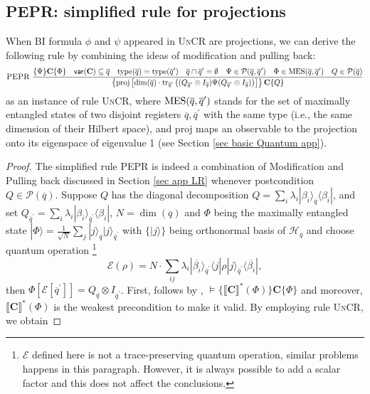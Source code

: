 \documentclass[conference,compsoc, 10pt]{IEEEtran}
\newcommand {\qbar} {{\overline{q}}}
\newcommand {\cP } {{\mathcal{P}}}
\newcommand {\cH } {{\mathcal{H}}}
\newcommand {\cE } {{\mathcal{E}}}
\newcommand {\id } {{I}}
\newcommand {\ptype} {{\mathrm{type}}}
\newcommand {\tr } {{\mathrm{tr}}}
\newcommand {\var } {\mathsf{var}}
\newcommand {\prog } {{\mathbf{C}}}
\newcommand {\sem}[1] {\llbracket#1\rrbracket}
\newcommand {\ol}[1] {{\overline{#1}}}
\def\>{\ensuremath{\rangle}}
\def\<{\ensuremath{\langle}}
\newcommand{\proj}{{\mathrm{proj}}}
\begin{document}
\begin{appendices}
		\subsection{\textsc{PEPR}: simplified rule for projections}
		\label{rule PERP}
		
		When BI formula $\phi$ and $\psi$ appeared in \textsc{UnCR} are projections, we can derive the following rule by combining the ideas of modification and pulling back: 
		\begin{equation*}
		\textsc{PEPR}\ \frac{\{\Psi\}\prog\{\Phi\}\quad \var(\prog)\subseteq \qbar\quad \ptype(\qbar) = \ptype(\qbar^\prime)\quad \qbar\cap\qbar^\prime=\emptyset \quad \Psi\in\cP(\qbar,\qbar^\prime)\quad\Phi\in{\rm MES}(\qbar,\qbar^\prime)\quad Q\in\cP(\qbar)}{\left\{\proj\left[\dim(\qbar)\cdot\tr_{\qbar^\prime}\left((Q_{\qbar^\prime}\otimes\id_{\qbar})\Psi(Q_{\qbar^\prime}\otimes\id_{\qbar})\right)\right]\right\}\prog\{Q\}}	
		\end{equation*}
		as an instance of rule \textsc{UnCR}, where ${\rm MES}(\qbar,\qbar^\prime)$ stands for the set of maximally entangled states of two disjoint registers $\qbar,\qbar^\prime$ with the same type (i.e., the same dimension of their Hilbert space), and $\proj$ maps an observable to the projection onto its eigenspace of eigenvalue 1 (see Section \ref{sec basic Quantum app}). 
		\begin{proof}
			The simplified rule \textsc{PEPR} is indeed a combination of Modification and Pulling back discussed in Section \ref{sec app LR} whenever postcondition $Q\in\cP(\qbar)$. Suppose $Q$ has the diagonal decomposition $Q = \sum_i\lambda_i|\beta_i\>_\qbar\<\beta_i|$, and set $Q_{\qbar^\prime} = \sum_i\lambda_i|\beta_i\>_{\qbar^\prime}\<\beta_i|$, $N = \dim(\qbar)$ and $\Phi$ being the maximally entangled state $|\Phi\> = \frac{1}{\sqrt{N}}\sum_j|j\>_\qbar|j\>_{\qbar^\prime}$ with $\{|j\>\}$ being orthonormal basis of $\cH_\qbar$ and choose quantum operation \footnote{$\cE$ defined here is not a trace-preserving quantum operation, similar problems happens in this paragraph. However, it is always possible to add a scalar factor and this does not affect the conclusions. }
			$$\cE(\rho) = N\cdot \sum_{ij}\lambda_i|\ol{\beta_i}\>_{\qbar^\prime}\<j|\rho|j\>_{\qbar^\prime}\<\ol{\beta_i}|,$$
			then $\Phi[\cE[\qbar^\prime]] = Q_\qbar\otimes\id_{\qbar^\prime}$. First, follows by \cite{YZL18}, $\models\{\sem{\prog}^\ast(\Phi)\}\prog\{\Phi\}$ and moreover, $\sem{\prog}^\ast(\Phi)$ is the weakest precondition to make it valid. By employing rule \textsc{UnCR}, we obtain

\end{proof}
\end{appendices}
\end{document}
